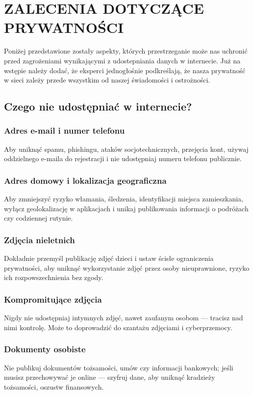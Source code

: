 \chapter{ZALECENIA DOTYCZĄCE PRYWATNOŚCI}
Poniżej przedstawione zostały aspekty, których przestrzeganie może nas uchronić przed zagrożeniami wynikającymi z udostepniania danych w internecie. Już na wstępie należy dodać, że eksperci jednogłośnie podkreślają, że nasza prywatność w sieci zależy przede wszystkim od naszej świadomości i ostrożności\cite{czegoNieUdostepniac}.

\section{Czego nie udostępniać w internecie?}
\subsection{Adres e-mail i numer telefonu}
Aby uniknąć spamu, phishingu, ataków socjotechnicznych, przejęcia kont, używaj oddzielnego e-maila do rejestracji i nie udostępniaj numeru telefonu publicznie.

\subsection{Adres domowy i lokalizacja geograficzna}
Aby zmniejszyć ryzyko włamania, śledzenia, identyfikacji miejsca zamieszkania, wyłącz geolokalizację w aplikacjach i unikaj publikowania informacji o podróżach czy codziennej rutynie.

\subsection{Zdjęcia nieletnich}
Dokładnie przemyśl publikację zdjęć dzieci i  ustaw ścisłe ograniczenia prywatności, aby uniknąć wykorzystanie zdjęć przez osoby nieuprawnione, ryzyko ich rozpowszechnienia bez zgody.

\subsection{Kompromitujące zdjęcia}
Nigdy nie udostępniaj intymnych zdjęć, nawet zaufanym osobom — tracisz nad nimi kontrolę. Może to doprowadzić do szantażu zdjęciami i cyberprzemocy.

\subsection{Dokumenty osobiste}
Nie publikuj dokumentów tożsamości, umów czy informacji bankowych; jeśli musisz przechowywać je online — szyfruj dane, aby uniknąć kradzieży tożsamości, oszustw finansowych.

